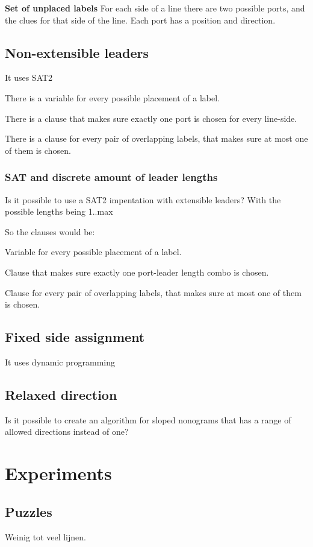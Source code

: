 \documentclass[a4paper]{article}
\begin{document}
\textbf{Set of unplaced labels} For each side of a line there are two possible ports, and the clues for that side of the line. Each port has a position and direction. 

\subsection{Non-extensible leaders}
It uses SAT2

There is a variable for every possible placement of a label.

There is a clause that makes sure exactly one port is chosen for every line-side.

There is a clause for every pair of overlapping labels, that makes sure at most one of them is chosen.

\subsubsection{SAT and discrete amount of leader lengths}

Is it possible to use a SAT2 impentation with extensible leaders? With the possible lengths being 1..max

So the clauses would be:

Variable for every possible placement of a label.

Clause that makes sure exactly one port-leader length combo is chosen.

Clause for every pair of overlapping labels, that makes sure at most one of them is chosen.


\subsection{Fixed side assignment}
It uses dynamic programming

\subsection{Relaxed direction}
Is it possible to create an algorithm for sloped nonograms that has a range of allowed directions instead of one?

\section{Experiments}
\subsection{Puzzles}
Weinig tot veel lijnen.
\end{document}
